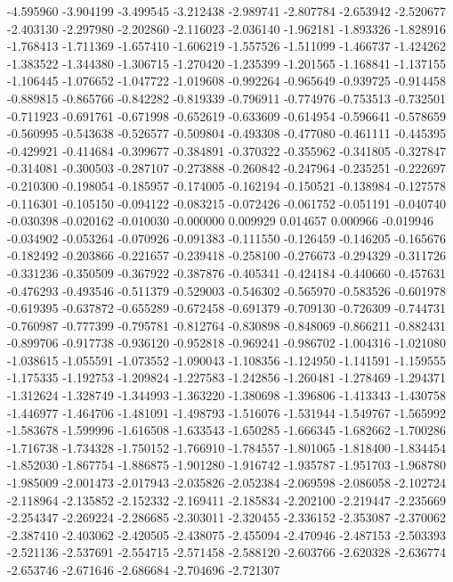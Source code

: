 -4.595960
-3.904199
-3.499545
-3.212438
-2.989741
-2.807784
-2.653942
-2.520677
-2.403130
-2.297980
-2.202860
-2.116023
-2.036140
-1.962181
-1.893326
-1.828916
-1.768413
-1.711369
-1.657410
-1.606219
-1.557526
-1.511099
-1.466737
-1.424262
-1.383522
-1.344380
-1.306715
-1.270420
-1.235399
-1.201565
-1.168841
-1.137155
-1.106445
-1.076652
-1.047722
-1.019608
-0.992264
-0.965649
-0.939725
-0.914458
-0.889815
-0.865766
-0.842282
-0.819339
-0.796911
-0.774976
-0.753513
-0.732501
-0.711923
-0.691761
-0.671998
-0.652619
-0.633609
-0.614954
-0.596641
-0.578659
-0.560995
-0.543638
-0.526577
-0.509804
-0.493308
-0.477080
-0.461111
-0.445395
-0.429921
-0.414684
-0.399677
-0.384891
-0.370322
-0.355962
-0.341805
-0.327847
-0.314081
-0.300503
-0.287107
-0.273888
-0.260842
-0.247964
-0.235251
-0.222697
-0.210300
-0.198054
-0.185957
-0.174005
-0.162194
-0.150521
-0.138984
-0.127578
-0.116301
-0.105150
-0.094122
-0.083215
-0.072426
-0.061752
-0.051191
-0.040740
-0.030398
-0.020162
-0.010030
-0.000000
0.009929
0.014657
0.000966
-0.019946
-0.034902
-0.053264
-0.070926
-0.091383
-0.111550
-0.126459
-0.146205
-0.165676
-0.182492
-0.203866
-0.221657
-0.239418
-0.258100
-0.276673
-0.294329
-0.311726
-0.331236
-0.350509
-0.367922
-0.387876
-0.405341
-0.424184
-0.440660
-0.457631
-0.476293
-0.493546
-0.511379
-0.529003
-0.546302
-0.565970
-0.583526
-0.601978
-0.619395
-0.637872
-0.655289
-0.672458
-0.691379
-0.709130
-0.726309
-0.744731
-0.760987
-0.777399
-0.795781
-0.812764
-0.830898
-0.848069
-0.866211
-0.882431
-0.899706
-0.917738
-0.936120
-0.952818
-0.969241
-0.986702
-1.004316
-1.021080
-1.038615
-1.055591
-1.073552
-1.090043
-1.108356
-1.124950
-1.141591
-1.159555
-1.175335
-1.192753
-1.209824
-1.227583
-1.242856
-1.260481
-1.278469
-1.294371
-1.312624
-1.328749
-1.344993
-1.363220
-1.380698
-1.396806
-1.413343
-1.430758
-1.446977
-1.464706
-1.481091
-1.498793
-1.516076
-1.531944
-1.549767
-1.565992
-1.583678
-1.599996
-1.616508
-1.633543
-1.650285
-1.666345
-1.682662
-1.700286
-1.716738
-1.734328
-1.750152
-1.766910
-1.784557
-1.801065
-1.818400
-1.834454
-1.852030
-1.867754
-1.886875
-1.901280
-1.916742
-1.935787
-1.951703
-1.968780
-1.985009
-2.001473
-2.017943
-2.035826
-2.052384
-2.069598
-2.086058
-2.102724
-2.118964
-2.135852
-2.152332
-2.169411
-2.185834
-2.202100
-2.219447
-2.235669
-2.254347
-2.269224
-2.286685
-2.303011
-2.320455
-2.336152
-2.353087
-2.370062
-2.387410
-2.403062
-2.420505
-2.438075
-2.455094
-2.470946
-2.487153
-2.503393
-2.521136
-2.537691
-2.554715
-2.571458
-2.588120
-2.603766
-2.620328
-2.636774
-2.653746
-2.671646
-2.686684
-2.704696
-2.721307
